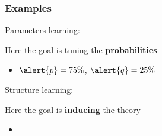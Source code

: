 \documentclass[presentation]{beamer}\mode<presentation>{\usetheme{AMSBolognaFC}}
\begin{document}
\begin{frame}[allowframebreaks]
    \frametitle{Examples}

    Parameters learning:

    \begin{exampleblock}{Here the goal is tuning the \textbf{probabilities}}
        \begin{itemize}
            \item $\alert{p} = 75\%$, \qquad $\alert{q} = 25\%$
        \end{itemize}
    \end{exampleblock}

    \framebreak

    Structure learning:
    \begin{exampleblock}{Here the goal is \textbf{inducing} the theory}
        \begin{itemize}
            \item {}
        \end{itemize}
    \end{exampleblock}
\end{frame}
\end{document}
